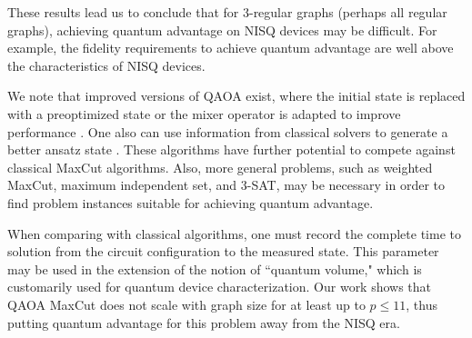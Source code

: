These results lead us to  conclude that for 3-regular graphs (perhaps all regular graphs),  achieving quantum advantage on NISQ devices may be difficult. For example, the fidelity requirements to achieve quantum advantage are well above the characteristics of NISQ devices.



We note that  improved versions of QAOA exist, where the initial state is replaced with a preoptimized state \cite{warmstartQAOA} or the mixer operator is adapted to improve performance \cite{zhu2020adaptive, Govia2021}. One also can use information from classical solvers to generate a better ansatz state \cite{wurtz2021classically}. These algorithms have further potential to compete against classical MaxCut algorithms.
Also, more general problems, such as weighted MaxCut, maximum independent set, and 3-SAT, may be necessary in order to find problem instances suitable for achieving quantum advantage.

When comparing with classical algorithms, one must record the complete time to solution from the  circuit configuration to the measured state. This parameter may be used in the extension of the notion of ``quantum volume," which is customarily used for quantum device characterization.
Our work shows that QAOA MaxCut does not scale with graph size for at least up to $p\leq11$, thus putting quantum advantage for this problem away from the NISQ era.

